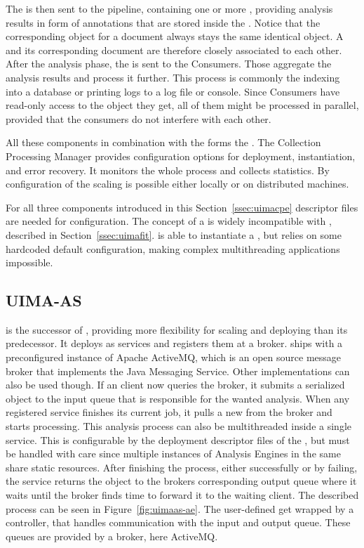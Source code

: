 The \cas{} is then sent to the pipeline, containing one or more \anens{}, providing analysis results in form of annotations that are stored inside the \cas{}. Notice that the corresponding \cas{} object for a document always stays the same identical object. A \cas{} and its corresponding document are therefore closely associated to each other. After the analysis phase, the \cas{} is sent to the \cas{} Consumers. Those aggregate the analysis results and process it further. This process is commonly the indexing into a database or printing logs to a log file or console. Since \cas{} Consumers have read-only access to the \cas{} object they get, all of them might be processed in parallel, provided that the consumers do not interfere with each other.

All these components in combination with the \uima{} \cpm{} forms the \uimacpe{}. The Collection Processing Manager provides configuration options for deployment, instantiation, and error recovery. It monitors the whole process and collects statistics. By configuration of the \cpm{} scaling is possible either locally or on distributed machines.

For all three components introduced in this Section~\ref{ssec:uimacpe} \xml{} descriptor files are needed for configuration. The concept of a \uimacpe{} is widely incompatible with \uimafit{}, described in Section~\ref{ssec:uimafit}. \uimafit{} is able to instantiate a \cpe{}, but relies on some hardcoded default configuration, making complex multithreading applications impossible.


\subsection{UIMA-AS}
\label{ssec:uimaas}
\uimaas{} is the successor of \uimacpe{}, providing more flexibility for scaling and deploying than its predecessor. It deploys \anens{} as services and registers them at a broker. \uimaas{} ships with a preconfigured instance of Apache ActiveMQ, which is an open source message broker that implements the Java Messaging Service. Other implementations can also be used though. If an \uimaas{} client now queries the broker, it submits a serialized \cas{} object to the input queue that is responsible for the wanted analysis. When any registered service finishes its current job, it pulls a new \cas{} from the broker and starts processing. This analysis process can also be multithreaded inside a single service. This is configurable by the deployment \xml{} descriptor files of the \anens{}, but must be handled with care since multiple instances of Analysis Engines in the same \jvm{} share static resources. After finishing the process, either successfully or by failing, the service returns the \cas{} object to the brokers corresponding output queue where it waits until the broker finds time to forward it to the waiting client. The described process can be seen in Figure~\ref{fig:uimaas-ae}. The user-defined \anen{} get wrapped by a \uimaas{} controller, that handles communication with the input and output queue. These queues are provided by a broker, here ActiveMQ.

